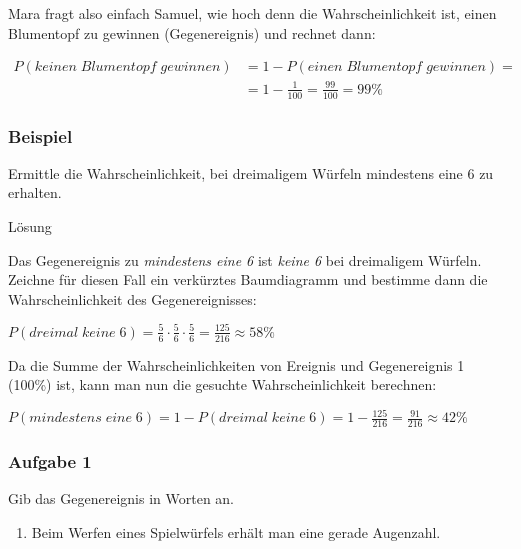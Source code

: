 \documentclass[
  ngerman,
]{book}
\providecommand{\tightlist}{%
  \setlength{\itemsep}{0pt}\setlength{\parskip}{0pt}}
\begin{document}
Mara fragt also einfach Samuel, wie hoch denn die Wahrscheinlichkeit ist, einen Blumentopf zu gewinnen (Gegenereignis) und rechnet dann:

\[\begin{align}
P(keinen\;Blumentopf\;gewinnen) &= 1- P(einen\;Blumentopf\;gewinnen) =\\
&= 1 - \frac{1}{100} = \frac{99}{100} = 99\%
\end{align}\]

\hypertarget{beispiel-5}{%
\subsubsection*{Beispiel}\label{beispiel-5}}

Ermittle die Wahrscheinlichkeit, bei dreimaligem Würfeln mindestens eine 6 zu erhalten.

Lösung

Das Gegenereignis zu \emph{mindestens eine 6} ist \emph{keine 6} bei dreimaligem Würfeln. Zeichne für diesen Fall ein verkürztes Baumdiagramm und bestimme dann die Wahrscheinlichkeit des Gegenereignisses:

\(P(dreimal\;keine\;6)= \frac{5}{6}\cdot\frac{5}{6}\cdot\frac{5}{6} = \frac{125}{216} \approx 58\%\)

Da die Summe der Wahrscheinlichkeiten von Ereignis und Gegenereignis 1 (100\%) ist, kann man nun die gesuchte Wahrscheinlichkeit berechnen:

\(P(mindestens\;eine\;6)= 1 - P(dreimal\;keine\;6) = 1- \frac{125}{216} = \frac{91}{216} \approx 42\%\)

\hypertarget{section-160}{%
\subsubsection*{}\label{section-160}}

\hypertarget{aufgabe-1-17}{%
\subsubsection*{Aufgabe 1}\label{aufgabe-1-17}}

Gib das Gegenereignis in Worten an.

\begin{enumerate}
\def\labelenumi{\alph{enumi})}
\tightlist
\item
  Beim Werfen eines Spielwürfels erhält man eine gerade Augenzahl.
\end{enumerate}
\end{document}
